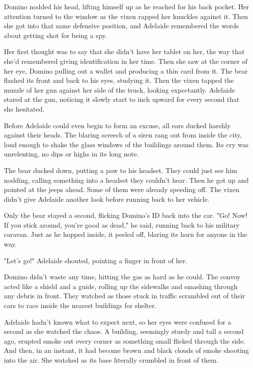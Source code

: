 Domino nodded his head, lifting himself up as he reached for his back pocket. Her attention turned to the window as the vixen rapped her knuckles against it. Then she got into that same defensive position, and Adelaide remembered the words about getting shot for being a spy.

Her first thought was to say that she didn't have her tablet on her, the way that she'd remembered giving identification in her time. Then she saw at the corner of her eye, Domino pulling out a wallet and producing a thin card from it. The bear flashed its front and back to his eyes, studying it. Then the vixen tapped the muzzle of her gun against her side of the truck, looking expectantly. Adelaide stared at the gun, noticing it slowly start to inch upward for every second that she hesitated.

Before Adelaide could even begin to form an excuse, all ears ducked harshly against their heads. The blaring screech of a siren rang out from inside the city, loud enough to shake the glass windows of the buildings around them. Its cry was unrelenting, no dips or highs in its long note.

The bear ducked down, putting a paw to his headset. They could just see him nodding, calling something into a headset they couldn't hear. Then he got up and pointed at the jeeps ahead. Some of them were already speeding off. The vixen didn't give Adelaide another look before running back to her vehicle.

Only the bear stayed a second, flicking Domino's ID back into the car. "Go! Now! If you stick around, you're good as dead," he said, running back to his military caravan. Just as he hopped inside, it peeled off, blaring its horn for anyone in the way.

"Let's go!" Adelaide shouted, pointing a finger in front of her.

Domino didn't waste any time, hitting the gas as hard as he could. The convoy acted like a shield and a guide, rolling up the sidewalks and smashing through any debris in front. They watched as those stuck in traffic scrambled out of their cars to race inside the nearest buildings for shelter.

Adelaide hadn't known what to expect next, so her eyes were confused for a second as she watched the chaos. A building, seemingly sturdy and tall a second ago, erupted smoke out every corner as something small flicked through the side. And then, in an instant, it had become brown and black clouds of smoke shooting into the air. She watched as its base literally crumbled in front of them.

